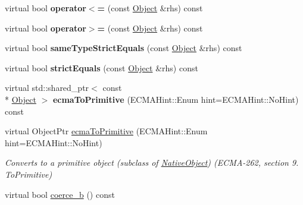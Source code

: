 \begin{DoxyCompactItemize}
\item 
\hypertarget{classjswf_1_1avm2_1_1_object_a16a905fd555a59ce1d29e76746e940b4}{virtual bool {\bfseries operator$<$=} (const \hyperlink{classjswf_1_1avm2_1_1_object}{Object} \&rhs) const }\label{classjswf_1_1avm2_1_1_object_a16a905fd555a59ce1d29e76746e940b4}

\item 
\hypertarget{classjswf_1_1avm2_1_1_object_a845c7fd546cfa0129338639a228be363}{virtual bool {\bfseries operator$>$=} (const \hyperlink{classjswf_1_1avm2_1_1_object}{Object} \&rhs) const }\label{classjswf_1_1avm2_1_1_object_a845c7fd546cfa0129338639a228be363}

\item 
\hypertarget{classjswf_1_1avm2_1_1_object_a85dfccddcf99772ffe3fa160c8cff935}{virtual bool {\bfseries same\+Type\+Strict\+Equals} (const \hyperlink{classjswf_1_1avm2_1_1_object}{Object} \&rhs) const }\label{classjswf_1_1avm2_1_1_object_a85dfccddcf99772ffe3fa160c8cff935}

\item 
\hypertarget{classjswf_1_1avm2_1_1_object_ae88ca0d26efbb597791a8e72dbf7b267}{virtual bool {\bfseries strict\+Equals} (const \hyperlink{classjswf_1_1avm2_1_1_object}{Object} \&rhs) const }\label{classjswf_1_1avm2_1_1_object_ae88ca0d26efbb597791a8e72dbf7b267}

\item 
\hypertarget{classjswf_1_1avm2_1_1_object_a98bb4755912f958f91f18b19c889aa49}{virtual std\+::shared\+\_\+ptr$<$ const \\*
\hyperlink{classjswf_1_1avm2_1_1_object}{Object} $>$ {\bfseries ecma\+To\+Primitive} (E\+C\+M\+A\+Hint\+::\+Enum hint=E\+C\+M\+A\+Hint\+::\+No\+Hint) const }\label{classjswf_1_1avm2_1_1_object_a98bb4755912f958f91f18b19c889aa49}

\item 
\hypertarget{classjswf_1_1avm2_1_1_object_ad4f91847c647ebda6984d93add7e3e2d}{virtual Object\+Ptr \hyperlink{classjswf_1_1avm2_1_1_object_ad4f91847c647ebda6984d93add7e3e2d}{ecma\+To\+Primitive} (E\+C\+M\+A\+Hint\+::\+Enum hint=E\+C\+M\+A\+Hint\+::\+No\+Hint)}\label{classjswf_1_1avm2_1_1_object_ad4f91847c647ebda6984d93add7e3e2d}

\begin{DoxyCompactList}\small\item\em Converts to a primitive object (subclass of \hyperlink{classjswf_1_1avm2_1_1_native_object}{Native\+Object}) (E\+C\+M\+A-\/262, section 9. {\itshape To\+Primitive}) \end{DoxyCompactList}\item 
\hypertarget{classjswf_1_1avm2_1_1_object_aca334088631f4dc1c49df9d93a806829}{virtual bool \hyperlink{classjswf_1_1avm2_1_1_object_aca334088631f4dc1c49df9d93a806829}{coerce\+\_\+b} () const }\label{classjswf_1_1avm2_1_1_object_aca334088631f4dc1c49df9d93a806829}


\end{DoxyCompactItemize}
